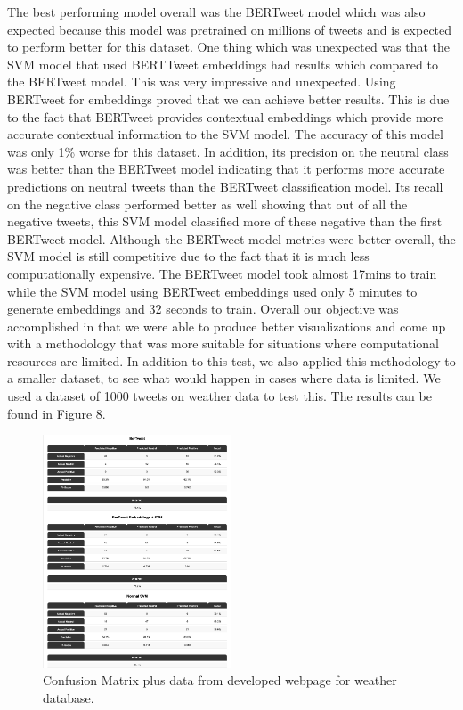 \documentclass[conference]{IEEEtran}
\begin{document}
The best performing model overall was the BERTweet model which was also expected because this model was pretrained on millions of tweets and is expected to perform better for this dataset. One thing which was unexpected was that the SVM model that used BERTTweet embeddings had results which compared to the BERTweet model. This was very impressive and unexpected. Using BERTweet for embeddings proved that we can achieve better results. This is due to the fact that BERTweet provides contextual embeddings which provide more accurate contextual information to the SVM model. The accuracy of this model was only 1\% worse for this dataset. In addition, its precision on the neutral class was better than the BERTweet model indicating that it performs more accurate predictions on neutral tweets than the BERTweet classification model. Its recall on the negative class performed better as well showing that out of all the negative tweets, this SVM model classified more of these negative than the first BERTweet model.
Although the BERTweet model metrics were better overall, the SVM model is still competitive due to the fact that it is much less computationally expensive.  The BERTweet model took almost 17mins to train while the SVM model using BERTweet embeddings used only 5 minutes to generate embeddings and 32 seconds to train. Overall our objective was accomplished in that we were able to produce better visualizations and come up with a methodology that was more suitable for situations where computational resources are limited. In addition to this test, we also applied this methodology to a smaller dataset, to see what would happen in cases where data is limited. We used a dataset of 1000 tweets on weather data to test this. The results can be found in Figure 8.

\begin{figure}[b!]
    \includegraphics[width=0.5\textwidth]{weather_results.png}
    \caption{Confusion Matrix plus data from developed webpage for weather database.}
\end{figure}
\end{document}
